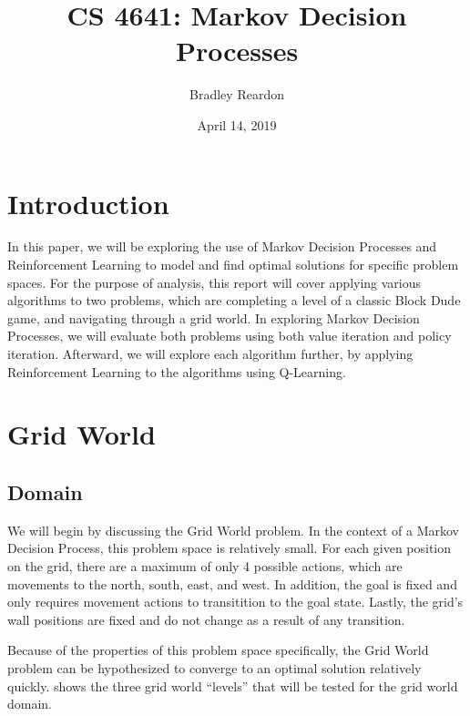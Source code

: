 \documentclass{article}
\title{\textbf{CS 4641:} Markov Decision Processes}
\author{Bradley Reardon}
\date{April 14, 2019}
\begin{document}
  \maketitle

  \section{Introduction}
    In this paper, we will be exploring the use of Markov Decision Processes and Reinforcement Learning to model and find optimal solutions for specific problem spaces. For the purpose of analysis, this report will cover applying various algorithms to two problems, which are completing a level of a classic Block Dude game, and navigating through a grid world. In exploring Markov Decision Processes, we will evaluate both problems using both value iteration and policy iteration. Afterward, we will explore each algorithm further, by applying Reinforcement Learning to the algorithms using Q-Learning.

  \section{Grid World}

    \subsection{Domain}
      We will begin by discussing the Grid World problem. In the context of a Markov Decision Process, this problem space is relatively small. For each given position on the grid, there are a maximum of only 4 possible actions, which are movements to the north, south, east, and west. In addition, the goal is fixed and only requires movement actions to transitition to the goal state. Lastly, the grid's wall positions are fixed and do not change as a result of any transition.

      Because of the properties of this problem space specifically, the Grid World problem can be hypothesized to converge to an optimal solution relatively quickly.  shows the three grid world ``levels'' that will be tested for the grid world domain.
\end{document}
